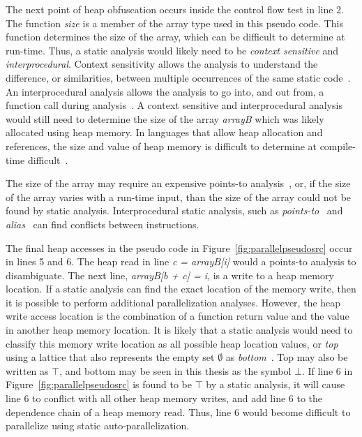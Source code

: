 \documentclass[defaultstyle,11pt]{thesis}
\begin{document}
The next point of heap obfuscation occurs inside the control flow test
in line 2. The function \textit{size} is a member of the array type
used in this pseudo code.  This function determines the size of the
array, which can be difficult to determine at run-time.  Thus, a
static analysis would likely need to be \textit{context sensitive} and
\textit{interprocedural}.  Context sensitivity allows the analysis to
understand the difference, or similarities, between multiple
occurrences of the same static code~\cite{emami:94:pldi}.  An
interprocedural analysis allows the analysis to go into, and out from,
a function call during analysis~\cite{allen:76:cacm}.  A context
sensitive and interprocedural analysis would still need to determine
the size of the array \textit{arrayB} which was likely allocated using
heap memory.  In languages that allow heap allocation and references,
the size and value of heap memory is difficult to determine at
compile-time difficult~\cite{kong:91:test, muchnick:97:mkp,
  towle:76:uiuccs}.

The size of the array may require an expensive points-to
analysis~\cite{steensgaard:96:popl}, or, if the size of the array
varies with a run-time input, than the size of the array could not be
found by static analysis. Interprocedural static analysis, such as
\textit{points-to}~\cite{steensgaard:96:popl} and
\textit{alias}~\cite{cooper:89:popl} can find conflicts between
instructions.

The final heap accesses in the pseudo code in
Figure~\ref{fig:parallelpseudosrc} occur in lines 5 and 6.  The heap
read in line \textit{c = arrayB[i]} would a points-to analysis to
disambiguate.  The next line, \textit{arrayB[b + c] = i}, is a write
to a heap memory location.  If a static analysis can find the exact
location of the memory write, then it is possible to perform
additional parallelization analyses.  However, the heap write access
location is the combination of a function return value and the value
in another heap memory location.  It is likely that a static analysis
would need to classify this memory write location as all possible heap
location values, or \textit{top} using a lattice that also represents
the empty set $\emptyset$ as \textit{bottom}~\cite{Tarski:1955kx,
  Davey:2002fj}.  Top may also be written as $\top$, and bottom may be
seen in this thesis as the symbol $\bot$.  If line 6 in
Figure~\ref{fig:parallelpseudosrc} is found to be $\top$ by a static
analysis, it will cause line 6 to conflict with all other heap memory
writes, and add line 6 to the dependence chain of a heap memory read.
Thus, line 6 would become difficult to parallelize using static
auto-parallelization.
\end{document}
